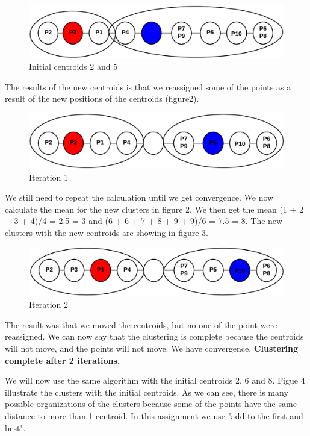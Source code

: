 	\begin{figure}[H]
		\includegraphics[width=\textwidth]{clustering1.png}	
		\caption{Initial centroids 2 and 5}
	\end{figure}

	The results of the new centroids is that we reassigned some of the points
	as a result of the new positions of the centroids (figure2).

	\begin{figure}[H]
		\includegraphics[width=\textwidth]{clustering3.png}	
		\caption{Iteration 1}
	\end{figure}

	We still need to repeat the calculation until we get convergence. We now
	calculate the mean for the new clusters in figure 2. We then get the mean
	(1 + 2 + 3 + 4)/4 = 2.5 = 3 and (6 + 6 + 7 + 8 + 9 + 9)/6 = 7.5 = 8.
	The new clusters with the new centroids are showing in figure 3.


	\begin{figure}[H]
		\includegraphics[width=\textwidth]{clustering5.png}	
		\caption{Iteration 2}
	\end{figure}

	The result was that we moved the centroids, but no one of the point were
	reassigned. We can now say that the clustering is complete because the
	centroids will not move, and the points will not move. We have
	convergence. {\bf Clustering complete after 2 iterations}.

	\clearpage
	We will now use the same algorithm with the initial centroids 2, 6 and 8. 
	Figue 4 illustrate the clusters with the initial centroids. As we can see,
	there is many possible organizations of the clusters because some of the 
	points have the same distance to more than 1 centroid. In this assignment
	we use "add to the first and best". 

